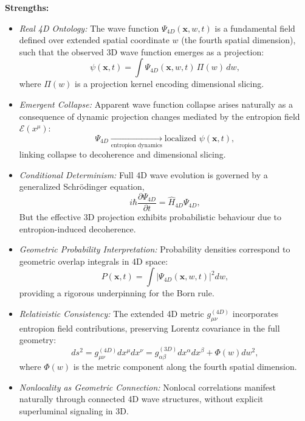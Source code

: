 \documentclass[12pt]{article}
\begin{document}
\textbf{Strengths:}
\begin{itemize}
    \item \emph{Real 4D Ontology:} The wave function $\Psi_{4D}(\mathbf{x}, w, t)$ is a fundamental field defined over extended spatial coordinate $w$ (the fourth spatial dimension), such that the observed 3D wave function emerges as a projection:
    \begin{equation}
        \psi(\mathbf{x}, t) = \int \Psi_{4D}(\mathbf{x}, w, t) \, \Pi(w) \, dw,
        \label{eq:projection}
    \end{equation}
    where $\Pi(w)$ is a projection kernel encoding dimensional slicing.
    \item \emph{Emergent Collapse:} Apparent wave function collapse arises naturally as a consequence of dynamic projection changes mediated by the entropion field $\mathcal{E}(x^\mu)$:
    \begin{equation}
        \Psi_{4D} \xrightarrow[\text{entropion dynamics}]{} \text{localized } \psi(\mathbf{x}, t),
        \label{eq:emergent_collapse}
    \end{equation}
    linking collapse to decoherence and dimensional slicing.
    \item \emph{Conditional Determinism:} Full 4D wave evolution is governed by a generalized Schrödinger equation,
    \begin{equation}
        i \hbar \frac{\partial \Psi_{4D}}{\partial t} = \hat{H}_{4D} \Psi_{4D},
        \label{eq:schrodinger_4D}
    \end{equation}
    But the effective 3D projection exhibits probabilistic behaviour due to entropion-induced decoherence.
    \item \emph{Geometric Probability Interpretation:} Probability densities correspond to geometric overlap integrals in 4D space:
    \begin{equation}
        P(\mathbf{x}, t) = \int \left| \Psi_{4D}(\mathbf{x}, w, t) \right|^{2} dw,
        \label{eq:prob_4D}
    \end{equation}
    providing a rigorous underpinning for the Born rule.
    \item \emph{Relativistic Consistency:} The extended 4D metric $g_{\mu\nu}^{(4D)}$ incorporates entropion field contributions, preserving Lorentz covariance in the full geometry:
    \begin{equation}
        ds^{2} = g_{\mu\nu}^{(4D)} dx^\mu dx^\nu = g_{\alpha\beta}^{(3D)} dx^\alpha dx^\beta + \Phi(w) dw^{2},
        \label{eq:metric_4D}
    \end{equation}
    where $\Phi(w)$ is the metric component along the fourth spatial dimension.
    \item \emph{Nonlocality as Geometric Connection:} Nonlocal correlations manifest naturally through connected 4D wave structures, without explicit superluminal signaling in 3D.
\end{itemize}
\end{document}
